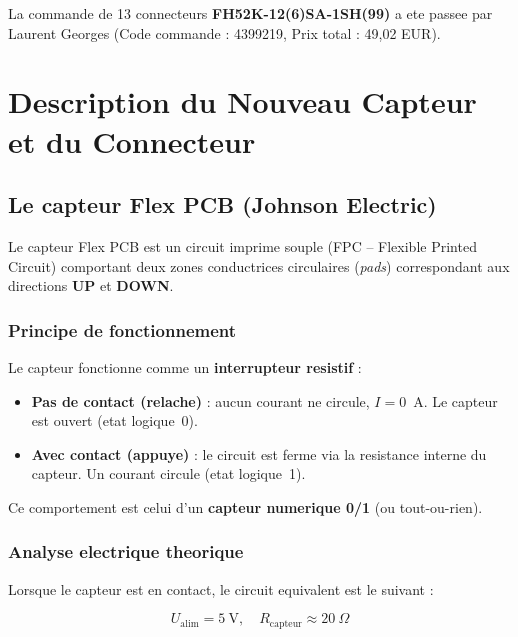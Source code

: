 \documentclass[12pt,a4paper]{article}
\begin{document}
\begin{tcolorbox}[colback=blue!5,colframe=blue!50,title=Information Cle]
La commande de 13 connecteurs \textbf{FH52K-12(6)SA-1SH(99)} a ete passee par
Laurent Georges (Code commande : 4399219, Prix total : 49,02 EUR).
\end{tcolorbox}

\section{Description du Nouveau Capteur et du Connecteur}

\subsection{Le capteur Flex PCB (Johnson Electric)}

Le capteur Flex PCB est un circuit imprime souple (FPC -- Flexible Printed Circuit)
comportant deux zones conductrices circulaires (\emph{pads}) correspondant aux
directions \textbf{UP} et \textbf{DOWN}.

\subsubsection{Principe de fonctionnement}

Le capteur fonctionne comme un \textbf{interrupteur resistif} :

\begin{itemize}
  \item \textbf{Pas de contact (relache)} : aucun courant ne circule, $I = 0$~A.
        Le capteur est ouvert (etat logique~0).
  \item \textbf{Avec contact (appuye)} : le circuit est ferme via la resistance
        interne du capteur. Un courant circule (etat logique~1).
\end{itemize}

Ce comportement est celui d'un \textbf{capteur numerique 0/1} (ou tout-ou-rien).

\subsubsection{Analyse electrique theorique}

Lorsque le capteur est en contact, le circuit equivalent est le suivant :

\[
  U_{\text{alim}} = 5~\text{V}, \quad R_{\text{capteur}} \approx 20~\Omega
\]
\end{document}
